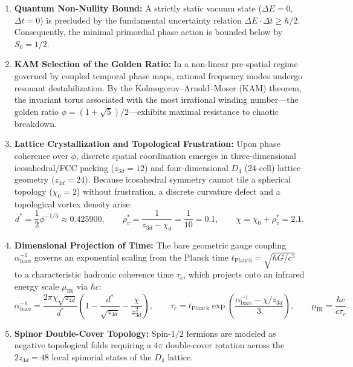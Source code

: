 \documentclass[11pt,a4paper]{article}
\begin{document}
\begin{enumerate}
    \item \textbf{Quantum Non-Nullity Bound:} A strictly static vacuum state ($\Delta E = 0$, $\Delta t = 0$) is precluded by the fundamental uncertainty relation $\Delta E \cdot \Delta t \ge \hbar / 2$. Consequently, the minimal primordial phase action is bounded below by $S_0 = 1/2$.
    \item \textbf{KAM Selection of the Golden Ratio:} In a non-linear pre-spatial regime governed by coupled temporal phase maps, rational frequency modes undergo resonant destabilization. By the Kolmogorov--Arnold--Moser (KAM) theorem, the invariant torus associated with the most irrational winding number---the golden ratio $\phi = (1+\sqrt{5})/2$---exhibits maximal resistance to chaotic breakdown.
    \item \textbf{Lattice Crystallization and Topological Frustration:} Upon phase coherence over $\phi$, discrete spatial coordination emerges in three-dimensional icosahedral/FCC packing ($z_{3d} = 12$) and four-dimensional $D_4$ (24-cell) lattice geometry ($z_{4d} = 24$). Because icosahedral symmetry cannot tile a spherical topology ($\chi_0 = 2$) without frustration, a discrete curvature defect and a topological vortex density arise:
    \begin{equation}
        d^* = \frac{1}{2}\phi^{-1/3} \approx 0.425900, \qquad \rho_v^* = \frac{1}{z_{3d} - \chi_0} = \frac{1}{10} = 0.1, \qquad \chi = \chi_0 + \rho_v^* = 2.1.
    \end{equation}
    \item \textbf{Dimensional Projection of Time:} The bare geometric gauge coupling $\alpha_{\mathrm{bare}}^{-1}$ governs an exponential scaling from the Planck time $t_{\mathrm{Planck}} = \sqrt{\hbar G / c^5}$ to a characteristic hadronic coherence time $\tau_c$, which projects onto an infrared energy scale $\mu_{\mathrm{IR}}$ via $\hbar c$:
    \begin{equation}
        \alpha_{\mathrm{bare}}^{-1} = \frac{2\pi \chi \sqrt{z_{4d}}}{d^*} \left(1 - \frac{d^*}{\sqrt{z_{4d}}} - \frac{\chi}{z_{3d}^2}\right), \qquad \tau_c = t_{\mathrm{Planck}} \exp\left(\frac{\alpha_{\mathrm{bare}}^{-1} - \chi / z_{3d}}{3}\right), \qquad \mu_{\mathrm{IR}} = \frac{\hbar c}{c \tau_c}.
    \end{equation}
    \item \textbf{Spinor Double-Cover Topology:} Spin-$1/2$ fermions are modeled as negative topological folds requiring a $4\pi$ double-cover rotation across the $2 z_{4d} = 48$ local spinorial states of the $D_4$ lattice.
\end{enumerate}
\end{document}
